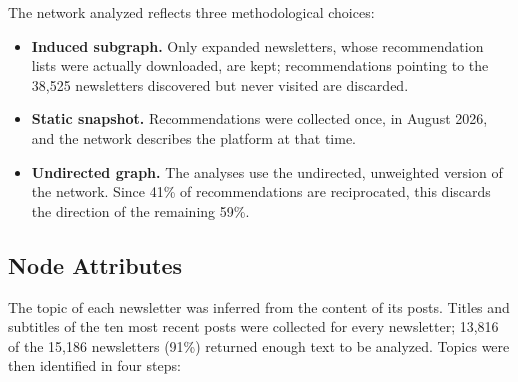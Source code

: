 \documentclass[sigchi]{acmart}
\begin{document}
The network analyzed reflects three methodological choices:
\begin{itemize}
  \item \textbf{Induced subgraph.} Only expanded newsletters, whose recommendation lists were actually downloaded, are kept;
  recommendations pointing to the 38{,}525 newsletters discovered but
  never visited are discarded.
  \item \textbf{Static snapshot.} Recommendations were collected once,
  in August 2026, and the network describes the platform at that time.
  \item \textbf{Undirected graph.} The analyses use the undirected,
  unweighted version of the network. Since 41\% of recommendations are
  reciprocated, this discards the direction of the remaining 59\%.
\end{itemize}

\subsection{Node Attributes}
\label{sec:attributes}
The topic of each newsletter was inferred from the content of its posts. Titles and subtitles of the ten most recent posts were collected for every newsletter; 13{,}816 of the 15{,}186 newsletters (91\%) returned enough text to be analyzed. Topics were then identified in four steps:
\end{document}
